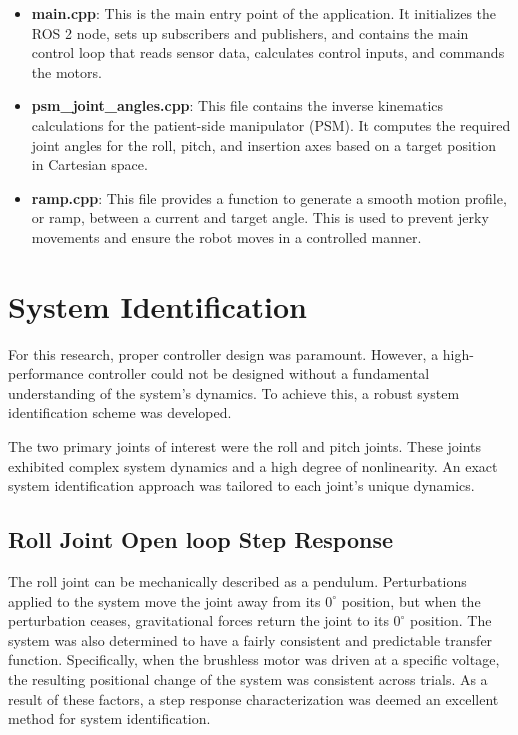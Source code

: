 \begin{itemize}
    \item \textbf{main.cpp}: This is the main entry point of the application. It initializes the ROS 2 node, sets up subscribers and publishers, and contains the main control loop that reads sensor data, calculates control inputs, and commands the motors.
    \item \textbf{psm\_joint\_angles.cpp}: This file contains the inverse kinematics calculations for the patient-side manipulator (PSM). It computes the required joint angles for the roll, pitch, and insertion axes based on a target position in Cartesian space.
    \item \textbf{ramp.cpp}: This file provides a function to generate a smooth motion profile, or ramp, between a current and target angle. This is used to prevent jerky movements and ensure the robot moves in a controlled manner.
\end{itemize}

\section{System Identification}

For this research, proper controller design was paramount. However, a high-performance controller could not be designed without a fundamental understanding of the system's dynamics. To achieve this, a robust system identification scheme was developed.

The two primary joints of interest were the roll and pitch joints. These joints exhibited complex system dynamics and a high degree of nonlinearity. An exact system identification approach was tailored to each joint's unique dynamics.

\subsection{Roll Joint Open loop Step Response}

The roll joint can be mechanically described as a pendulum. Perturbations applied to the system move the joint away from its $0^\circ$ position, but when the perturbation ceases, gravitational forces return the joint to its $0^\circ$ position. The system was also determined to have a fairly consistent and predictable transfer function. Specifically, when the brushless motor was driven at a specific voltage, the resulting positional change of the system was consistent across trials. As a result of these factors, a step response characterization was deemed an excellent method for system identification.

